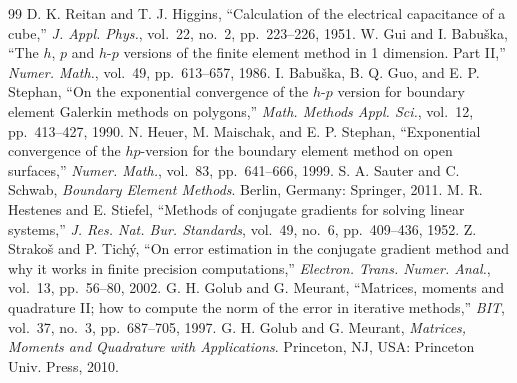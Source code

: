 \documentclass[journal]{IEEEtran}
\begin{document}
\begin{thebibliography}{99}
 D. K. Reitan and T. J. Higgins, ``Calculation of the electrical capacitance of a cube,'' \emph{J. Appl. Phys.}, vol.~22, no.~2, pp.~223--226, 1951.
 W. Gui and I. Babu\v{s}ka, ``The $h$, $p$ and $h$-$p$ versions of the finite element method in 1 dimension. Part II,'' \emph{Numer. Math.}, vol.~49, pp.~613--657, 1986.
 I. Babu\v{s}ka, B. Q. Guo, and E. P. Stephan, ``On the exponential convergence of the $h$-$p$ version for boundary element Galerkin methods on polygons,'' \emph{Math. Methods Appl. Sci.}, vol.~12, pp.~413--427, 1990.
 N. Heuer, M. Maischak, and E. P. Stephan, ``Exponential convergence of the $hp$-version for the boundary element method on open surfaces,'' \emph{Numer. Math.}, vol.~83, pp.~641--666, 1999.
 S. A. Sauter and C. Schwab, \emph{Boundary Element Methods}. Berlin, Germany: Springer, 2011.
 M. R. Hestenes and E. Stiefel, ``Methods of conjugate gradients for solving linear systems,'' \emph{J. Res. Nat. Bur. Standards}, vol.~49, no.~6, pp.~409--436, 1952.
 Z. Strako\v{s} and P. Tich\'y, ``On error estimation in the conjugate gradient method and why it works in finite precision computations,'' \emph{Electron. Trans. Numer. Anal.}, vol.~13, pp.~56--80, 2002.
 G. H. Golub and G. Meurant, ``Matrices, moments and quadrature II; how to compute the norm of the error in iterative methods,'' \emph{BIT}, vol.~37, no.~3, pp.~687--705, 1997.
 G. H. Golub and G. Meurant, \emph{Matrices, Moments and Quadrature with Applications}. Princeton, NJ, USA: Princeton Univ. Press, 2010.
\end{thebibliography}
\end{document}
